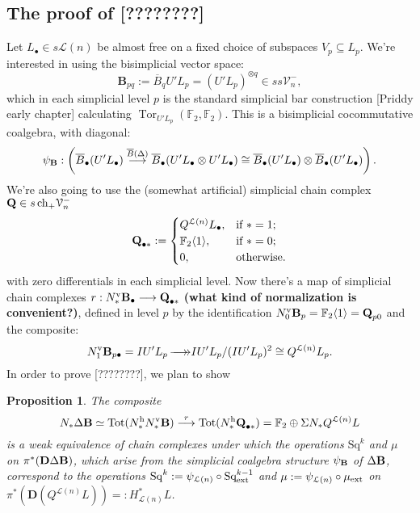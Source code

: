 \documentclass[11pt]{amsart}
\theoremstyle{plain}
\newtheorem{prop}[thm]{Proposition}
\theoremstyle{definition}
\DeclareMathOperator{\Tor}{Tor}
\renewcommand{\to}{\longrightarrow}
\newcommand{\calL}{\mathcal{L}}
\newcommand{\calV}{\mathcal{V}}
\theoremstyle{plain}
\newcommand{\vect}[2]{\calV^{#1}_{#2}}
\newcommand{\ExtCohOp}{\textup{Sq}_\textup{ext}}
\newcommand{\ExtCohProd}{\mu_\textup{ext}}
\newcommand{\epi}{{\,\makebox[0cm][l]{\ensuremath\to}\to}}
\newcommand{\UEA}{U'}%
\newcommand{\Sq}{\mathrm{Sq}}
\newcommand{\F}{\mathbb{F}}
\newcommand{\complexes}{\textup{ch}_+}
\newcommand{\dual}{\mathbf{D}}
\begin{document}
\begin{appendices}
\subsection{The proof of [????????]}

Let $ L_\bullet\in s\calL(n)$ be almost free on a fixed choice of subspaces $V_p\subseteq  L_p$.
We're interested in using the bisimplicial vector space:
\[\textbf{B}_{pq}:=\overline{B}_q \UEA L_p=(\UEA L_p)^{\otimes q}\in ss\vect{-}{n},\]
which in each simplicial level $p$ is the standard simplicial bar construction [Priddy early chapter] calculating $\Tor_{\UEA L_p}(\F_2,\F_2)$.
This is a bisimplicial cocommutative coalgebra, with diagonal:
\[\psi_{\textup{\textbf{B}}}:\left(\overline{B}_\bullet (\UEA L_\bullet)\overset{\overline{B}(\Delta)}{\to}\overline{B}_\bullet (\UEA L_\bullet\otimes \UEA L_\bullet)\cong\overline{B}_\bullet (\UEA L_\bullet)\otimes \overline{B}_\bullet (\UEA L_\bullet)\right).\]
We're also going to use the (somewhat artificial) simplicial chain complex $\textbf{Q}\in s\,\complexes\vect{-}{n}$
\[\textbf{Q}_{\bullet *}:=\begin{cases}
Q^{\calL(n)} L_\bullet,&\textup{if }*=1;\\
\F_2\langle 1\rangle,&\textup{if }*=0;
\\0,&\textup{otherwise.}
\end{cases}
\]
with zero differentials in each simplicial level. Now there's a map of simplicial chain complexes $r:N_*^\textup{v}\textbf{B}_\bullet\to \textbf{Q}_{\bullet*}$ \textbf{(what kind of normalization is convenient?)}, defined in level $p$ by the identification $N^\textup{v}_0\textbf{B}_p=\F_2\langle 1\rangle=\textbf{Q}_{p0}$ and the composite:
\[N^\textup{v}_1\textbf{B}_{p\bullet}=I\UEA L_p\epi I\UEA L_p/(I\UEA L_p)^2\cong Q^{\calL(n)} L_p.\]
In order to prove [????????], we plan to show
\begin{prop}\label{the point of the appendix} The composite
\[N_*\Delta\textbf{\textup{B}}\simeq\textup{Tot}(N^\textup{h}_*N^\textup{v}_*\textbf{\textup{B}})\overset{r}{\to} \textup{Tot}(N^\textup{h}_*\textbf{\textup{Q}}_{\bullet*})=\F_2\oplus \Sigma N_*Q^{\calL(n)} L\]
is a weak equivalence of chain complexes under which the operations $\Sq^k$ and $\mu$ on $\pi^*(\dual\Delta\textup{\textbf{B}})$, which arise from the simplicial coalgebra structure $\psi_{\textup{\textbf{B}}}$ of $\Delta \textup{\textbf{B}}$, correspond to the operations $\Sq^k:=\psi_{\calL(n)}\circ\ExtCohOp^{k-1}$ and $\mu:=\psi_{\calL(n)}\circ\ExtCohProd$ on $\pi^*(\dual(Q^{\calL(n)} L))=:H^*_{\calL(n)} L$.
\end{prop}


\end{appendices}
\end{document}
